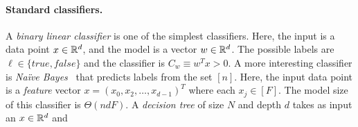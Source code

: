 \paragraph{Standard classifiers.}
A {\em binary linear classifier} is one of the simplest classifiers. Here,
the input is a data point $x\in{\mathbb{R}}^d$,
and the model is a vector $w\in{\mathbb{R}}^d$.
 The possible labels are
$\ell\in\{\mathit{true},\mathit{false}\}$ and the classifier is
$C_w\equiv w^Tx>0$.
%
A more interesting classifier is {\em Na\"{i}ve Bayes}~\cite{shafindss} that predicts labels
from the set $[n]$.
Here, the input data point is a {\it feature}
vector $x=(x_0,x_2,\ldots,x_{d-1})^T$ where each $x_j\in [F]$.
The model size of this classifier is $\Theta(ndF)$.
%
A {\em decision tree} of size $N$ and depth $d$ takes as input an $x\in{\mathbb{R}}^d$
 and 

